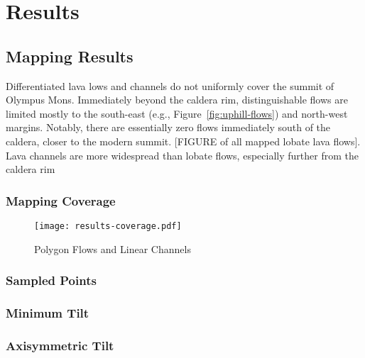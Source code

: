 \chapter{Results}

\section{Mapping Results}

Differentiated lava lows and channels do not uniformly cover the summit of Olympus Mons. Immediately beyond the caldera rim, distinguishable flows are limited mostly to the south-east (e.g., Figure~\ref{fig:uphill-flows}) and north-west margins. Notably, there are essentially zero flows immediately south of the caldera, closer to the modern summit. [FIGURE of all mapped lobate lava flows]. Lava channels are more widespread than lobate flows, especially further from the caldera rim 

\subsection{Mapping Coverage}
\begin{figure}
    \texttt{[image: results-coverage.pdf]}%
    \caption[Mapping Coverage]{Polygon Flows and Linear Channels}%
    \label{fig:results-coverage}
\end{figure}
\subsection{Sampled Points}
\subsection{Minimum Tilt}
\subsection{Axisymmetric Tilt}

